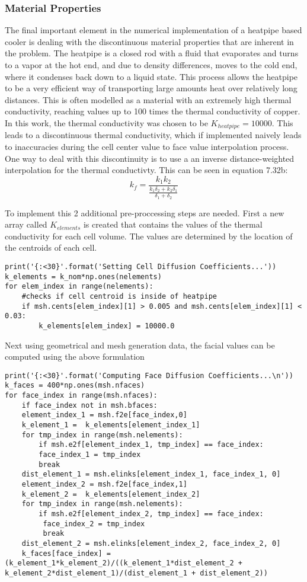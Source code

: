 \documentclass[11pt]{article}
\begin{document}
\subsubsection{Material Properties}
\label{sec:org28e2809}
The final important element in the numerical implementation of a heatpipe based cooler is dealing with the discontinuous material properties that are inherent in the problem. The heatpipe is a closed rod with a fluid that evaporates and turns to a vapor at the hot end, and due to density differences, moves to the cold end, where it condenses back down to a liquid state. This process allows the heatpipe to be a very efficient way of transporting large amounts heat over relatively long distances. This is often modelled as a material with an extremely high thermal conductivity, reaching values up to 100 times the thermal conductivity of copper. In this work, the thermal conductivity was chosen to be \(K_{heatpipe}=10000\). 
This leads to a discontinuous thermal conductivity, which if implemented naively leads to inaccuracies during the cell center value to face value interpolation process. 
One way to deal with this discontinuity is to use a an inverse distance-weighted interpolation for the thermal conductivty. This can be seen in equation 7.32b:
\[
  k_{f} = \frac{k_{1}k_{2}}{\frac{k_{1}\delta_{2} + k_{2}\delta_{1}}{\delta_{1}+\delta_{2}}}
  \]

To implement this 2 additional pre-proccessing steps are needed. First a new array called \(K_{elements}\) is created that contains the values of the thermal conductivity for each cell volume. The values are determined by the location of the centroids of each cell.
\begin{verbatim}
print('{:<30}'.format('Setting Cell Diffusion Coefficients...'))
k_elements = k_nom*np.ones(nelements)
for elem_index in range(nelements): 
    #checks if cell centroid is inside of heatpipe
    if msh.cents[elem_index][1] > 0.005 and msh.cents[elem_index][1] < 0.03:
	    k_elements[elem_index] = 10000.0
\end{verbatim}
Next using geometrical and mesh generation data, the facial values can be computed using the above formulation
\begin{verbatim}
print('{:<30}'.format('Computing Face Diffusion Coefficients...\n'))
k_faces = 400*np.ones(msh.nfaces)
for face_index in range(msh.nfaces):
    if face_index not in msh.bfaces:
	element_index_1 = msh.f2e[face_index,0]
	k_element_1 =  k_elements[element_index_1]
	for tmp_index in range(msh.nelements):
	    if msh.e2f[element_index_1, tmp_index] == face_index:
		face_index_1 = tmp_index
		break
	dist_element_1 = msh.elinks[element_index_1, face_index_1, 0]
	element_index_2 = msh.f2e[face_index,1]
	k_element_2 =  k_elements[element_index_2]
	for tmp_index in range(msh.nelements):
	    if msh.e2f[element_index_2, tmp_index] == face_index:
		 face_index_2 = tmp_index
		 break
	dist_element_2 = msh.elinks[element_index_2, face_index_2, 0]
	k_faces[face_index] = (k_element_1*k_element_2)/((k_element_1*dist_element_2 + k_element_2*dist_element_1)/(dist_element_1 + dist_element_2))
\end{verbatim}
\end{document}
